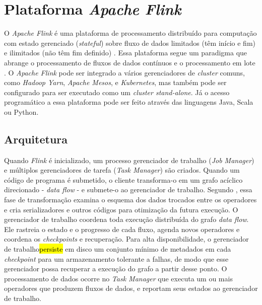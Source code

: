 


\section{Plataforma \emph{Apache Flink}}

O \emph{Apache Flink} é uma plataforma de processamento distribuído para
computação com estado gerenciado (\emph{stateful}) sobre fluxo de dados limitados (têm início e
fim) e ilimitados (não têm fim definido) \cite{ApacheFlink2020}.
Essa plataforma segue um paradigma que abrange o processamento de fluxos de
dados contínuos e o processamento em lote \cite{Carbone2015,Lopez2018}.
O \emph{Apache Flink} pode ser integrado a vários gerenciadores de \emph{cluster}
comuns, como \emph{Hadoop Yarn}, \emph{Apache Mesos}, e \emph{Kubernetes}, mas também pode ser
configurado para ser executado como um \emph{cluster stand-alone}.
Já o acesso programático a essa plataforma pode ser feito através das linguagens
Java, Scala ou Python.

\subsection{Arquitetura}

\newcommand{\jobmngr}{\xspace{}gerenciador de trabalho\xspace}
\newcommand{\taskmngr}{\xspace{}gerenciador de tarefa\xspace}

Quando \emph{Flink} é inicializado, um processo \jobmngr
(\emph{Job Manager}) e múltiplos gerenciadores de tarefa (\emph{Task Manager}) são criados.
Quando um código de programa é submetido, o cliente transforma-o em um grafo
acíclico direcionado - \emph{data flow} - e submete-o ao \jobmngr.
Segundo , essa fase de transformação examina o esquema
dos dados trocados entre os operadores e cria serializadores e
outros códigos para otimização da futura execução.
O \jobmngr coordena toda execução distribuída do grafo \emph{data
flow}. Ele rastreia o estado e o progresso de cada fluxo, agenda novos
operadores e coordena os \emph{checkpoints} e recuperação.
Para alta disponibilidade, o \jobmngr \hl{persiste} em disco um conjunto mínimo de
metadados em cada \emph{checkpoint} para um armazenamento tolerante a falhas, de
modo que esse gerenciador possa recuperar a execução do grafo a partir desse
ponto.
O processamento de dados ocorre no \emph{Task Manager} que executa um ou mais
operadores que produzem fluxos de dados, e reportam seus estados ao \jobmngr.

